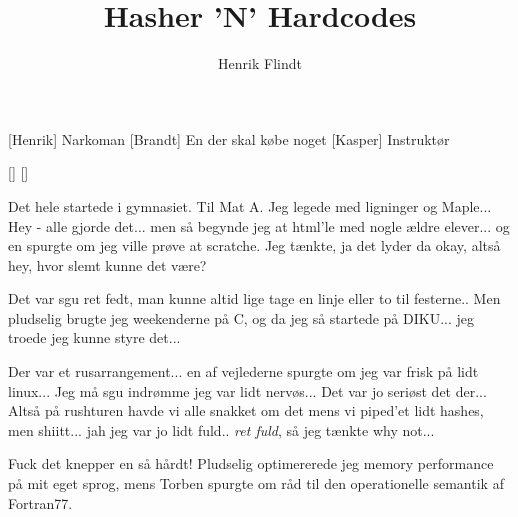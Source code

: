 \documentclass[a4paper,11pt]{article}
\title{Hasher 'N' Hardcodes}
\author{Henrik Flindt}
\begin{document}
\maketitle

\begin{roles}
  [Henrik] Narkoman
  [Brandt] En der skal købe noget
  [Kasper] Instruktør
\end{roles}

\begin{props}
[]
[]
\end{props}


\begin{sketch}


 Det hele startede i gymnasiet. Til Mat A. Jeg legede med ligninger
og Maple... Hey - alle gjorde det... men så begynde jeg at html'le med nogle
ældre elever... og en spurgte om jeg ville prøve at scratche.
Jeg tænkte, ja det lyder da okay, altså hey, hvor slemt kunne det være?

 Det var sgu ret fedt, man kunne altid lige tage en linje eller to til festerne..
Men pludselig brugte jeg weekenderne på C, og da jeg så startede på DIKU...  jeg troede jeg kunne styre det...


 Der var et rusarrangement... en af vejlederne spurgte om jeg var frisk på lidt linux...
Jeg må sgu indrømme jeg var lidt nervøs... Det var jo seriøst det der...
Altså på rushturen havde vi alle snakket om det mens vi piped'et lidt hashes, men shiitt...
 jah jeg var jo lidt fuld.. \emph{ret fuld}, så jeg tænkte why not...


Fuck det knepper en så hårdt! Pludselig optimererede jeg memory performance på mit eget sprog,
mens Torben spurgte om råd til den operationelle semantik af Fortran77.



\end{sketch}
\end{document}
